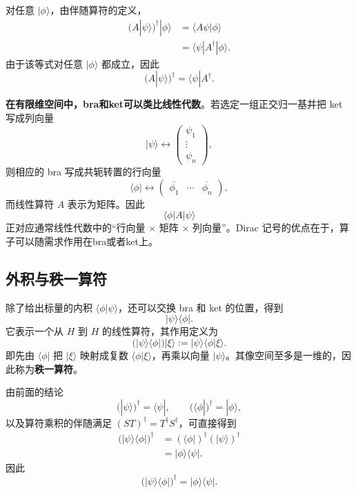 \documentclass[UTF8,a4paper,11pt,openany]{ctexbook}
\begin{document}
\begin{proposition}[算符和态矢复合的伴随]
对任意 $|\phi\rangle$，由伴随算符的定义，
\begin{align}
    \bigl(A|\psi\rangle\bigr)^\dagger|\phi\rangle
    &=
    \langle A\psi|\phi\rangle
    \nonumber\\
    &=
    \langle\psi|A^\dagger|\phi\rangle.
\end{align}
由于该等式对任意 $|\phi\rangle$ 都成立，因此
\begin{equation}
    \bigl(A|\psi\rangle\bigr)^\dagger
    =
    \langle\psi|A^\dagger.
\end{equation}    
\end{proposition}


\textbf{在有限维空间中，bra和ket可以类比线性代数}。若选定一组正交归一基并把 ket 写成列向量
\[
|\psi\rangle
\longleftrightarrow
\begin{pmatrix}
\psi_1\\
\vdots\\
\psi_n
\end{pmatrix},
\]
则相应的 bra 写成共轭转置的行向量
\[
\langle\phi|
\longleftrightarrow
\begin{pmatrix}
\overline{\phi_1}&\cdots&\overline{\phi_n}
\end{pmatrix},
\]
而线性算符 $A$ 表示为矩阵。因此
\begin{equation}
    \langle\phi|A|\psi\rangle
\end{equation}
正对应通常线性代数中的“行向量 $\times$ 矩阵 $\times$ 列向量”。Dirac 记号的优点在于，算子可以随需求作用在bra或者ket上。

\subsection{外积与秩一算符}

除了给出标量的内积 $\langle\phi|\psi\rangle$，还可以交换 bra 和 ket 的位置，得到
\[
|\psi\rangle\langle\phi|.
\]
它表示一个从 $H$ 到 $H$ 的线性算符，其作用定义为
\begin{equation}
    \bigl(|\psi\rangle\langle\phi|\bigr)|\xi\rangle
    :=
    |\psi\rangle\langle\phi|\xi\rangle.
\end{equation}
即先由 $\langle\phi|$ 把 $|\xi\rangle$ 映射成复数 $\langle\phi|\xi\rangle$，再乘以向量 $|\psi\rangle$。其像空间至多是一维的，因此称为\textbf{秩一算符}。

由前面的结论
\[
(|\psi\rangle)^\dagger=\langle\psi|,
\qquad
(\langle\phi|)^\dagger=|\phi\rangle,
\]
以及算符乘积的伴随满足 $(ST)^\dagger=T^\dagger S^\dagger$，可直接得到
\begin{align}
    \bigl(|\psi\rangle\langle\phi|\bigr)^\dagger
    &=
    (\langle\phi|)^\dagger
    (|\psi\rangle)^\dagger
    \nonumber\\
    &=
    |\phi\rangle\langle\psi|.
\end{align}
因此
\begin{equation}
    \boxed{
        \bigl(|\psi\rangle\langle\phi|\bigr)^\dagger
        =
        |\phi\rangle\langle\psi|
    }.
\end{equation}
\end{document}
